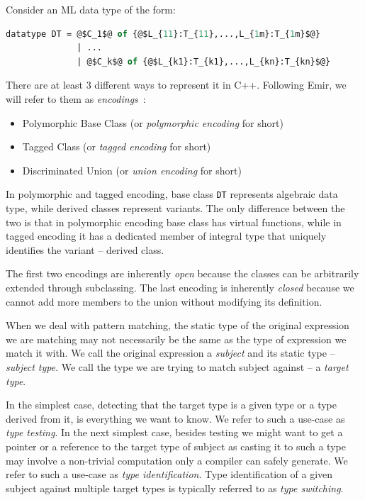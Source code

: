 \documentclass[preprint]{sigplanconf}
\makeatletter
\DeclareRobustCommand{\code}[1]{{\lstinline[breaklines=false,escapechar=@]{#1}}}
\makeatother
\begin{document}
Consider an ML data type of the form:

\begin{lstlisting}[language=ML,keepspaces,columns=flexible,escapechar=@]
datatype DT = @$C_1$@ of {@$L_{11}:T_{11},...,L_{1m}:T_{1m}$@} 
              | ...
              | @$C_k$@ of {@$L_{k1}:T_{k1},...,L_{kn}:T_{kn}$@}
\end{lstlisting}

\noindent There are at least 3 different ways to represent it in C++. Following 
Emir, we will refer to them as \emph{encodings}~\cite{EmirThesis}:

\begin{itemize}
\setlength{\itemsep}{0pt}
\setlength{\parskip}{0pt}
\item Polymorphic Base Class (or \emph{polymorphic encoding} for short)
\item Tagged Class (or \emph{tagged encoding} for short)
\item Discriminated Union (or \emph{union encoding} for short)
\end{itemize}

\noindent
In polymorphic and tagged encoding, base class \code{DT} represents algebraic 
data type, while derived classes represent variants. The only difference between 
the two is that in polymorphic encoding base class has virtual functions, while 
in tagged encoding it has a dedicated member of integral type that uniquely 
identifies the variant -- derived class. 

The first two encodings are inherently \emph{open} because the classes can be 
arbitrarily extended through subclassing. The last encoding is inherently 
\emph{closed} because we cannot add more members to the union without modifying 
its definition.


When we deal with pattern matching, the static type of the original expression 
we are matching may not necessarily be the same as the type of expression we 
match it with. We call the original expression a \emph{subject} and its static 
type -- \emph{subject type}. We call the type we are trying to match subject 
against -- a \emph{target type}.

In the simplest case, detecting that the target type is a given type or a type 
derived from it, is everything we want to know. We refer to such a use-case as 
\emph{type testing}. In the next simplest case, besides testing we might want to 
get a pointer or a reference to the target type of subject as casting it to such 
a type may involve a non-trivial computation only a compiler can safely 
generate. We refer to such a use-case as \emph{type identification}. Type 
identification of a given subject against multiple target types is typically 
referred to as \emph{type switching}.
\end{document}
